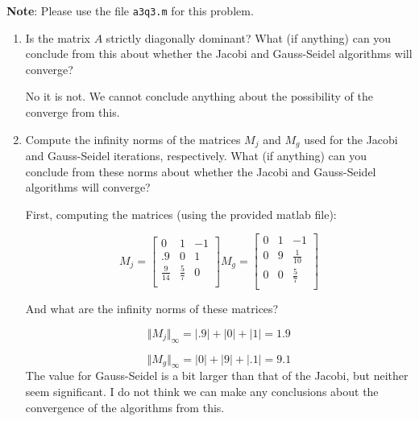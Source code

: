 \documentclass{article}
\begin{document}
\begin{enumerate}
{\bf Note}: Please use the file {\tt a3q3.m} for this problem.

\begin{enumerate}
\item Is the matrix $A$ strictly diagonally dominant? What (if anything) can you conclude from this about whether the Jacobi and Gauss-Seidel algorithms will converge? \newline

\begin{mdframed}[style=MyFrame]
No it is not. We cannot conclude anything about the possibility of the converge from this.
\end{mdframed}

\item Compute the infinity norms of the matrices $M_j$ and $M_g$ used for the Jacobi and Gauss-Seidel iterations, respectively. What (if anything) can you conclude from these norms about whether the Jacobi and Gauss-Seidel algorithms will converge?

\begin{mdframed}[style=MyFrame]
First, computing the matrices (using the provided matlab file):

\begin{equation*}
  M_{j} = \begin{bmatrix}
     0     &1     &-1 \\
     .9     &0     &1 \\
     \frac{9}{14}     &\frac{5}{7}     &0 \\
  \end{bmatrix}
M_{g} = \begin{bmatrix}
 0     &1     &-1 \\
 0     &9     &\frac{1}{10} \\
0       &0     &\frac{5}{7} \\
\end{bmatrix}
\end{equation*}

And what are the infinity norms of these matrices?

\begin{equation*}
\Vert M_{j} \Vert_{\infty} = |.9| + |0| + |1| = 1.9
\end{equation*}

\begin{equation*}
\Vert M_{g} \Vert_{\infty} = |0| + |9| + |.1| = 9.1
\end{equation*}
The value for Gauss-Seidel is a bit larger than that of the Jacobi, but neither seem significant. I do not think we can make any conclusions about the convergence of the algorithms from this.
\end{mdframed}


\end{enumerate}
\end{enumerate}
\end{document}
